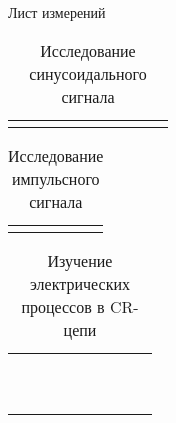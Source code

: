 \documentclass[a4paper,12pt]{article}
\begin{document}
	\newpage
	\pagestyle{fancy}
	
	\begin{center}
		Лист измерений
	\end{center}
\begin{table}[h]
	\caption{Исследование синусоидального сигнала}
	\begin{tabularx}{\textwidth}{|X|X|X|X|X|X|X|X|X|X|}
		\hline 
		&  &  &  &  &  &  &  &  &  \\ 
		\hline 
		&  &  &  &  &  &  &  &  &  \\ 
		\hline 
	\end{tabularx} 
\end{table}

\begin{table}[h]
	\caption{Исследование импульсного сигнала}
\begin{tabularx}{\textwidth}{|X|X|X|X|}
	\hline 
	&  &  &  \\ 
	\hline 
	&  &  &  \\ 
	\hline 
\end{tabularx} 	
\end{table}

\begin{table}[h]
	\caption{Изучение электрических процессов в CR-цепи}
	\begin{tabularx}{\textwidth}{|X|X|X|X|X|X|X|X|X|}
		\hline 
		&  &  &  &  &  &  &  &  \\ 
		\hline 
		&  &  &  &  &  &  &  &  \\ 
		\hline 
		&  &  &  &  &  &  &  &  \\ 
		\hline 
		&  &  &  &  &  &  &  &  \\ 
		\hline 
		&  &  &  &  &  &  &  &  \\ 
		\hline 
		&  &  &  &  &  &  &  &  \\ 
		\hline 
		&  &  &  &  &  &  &  &  \\ 
		\hline 
		&  &  &  &  &  &  &  &  \\ 
		\hline 
		&  &  &  &  &  &  &  &  \\ 
		\hline 
		&  &  &  &  &  &  &  &  \\ 
		\hline 
		&  &  &  &  &  &  &  &  \\ 
		\hline 
	\end{tabularx} 
\end{table}
\end{document}
